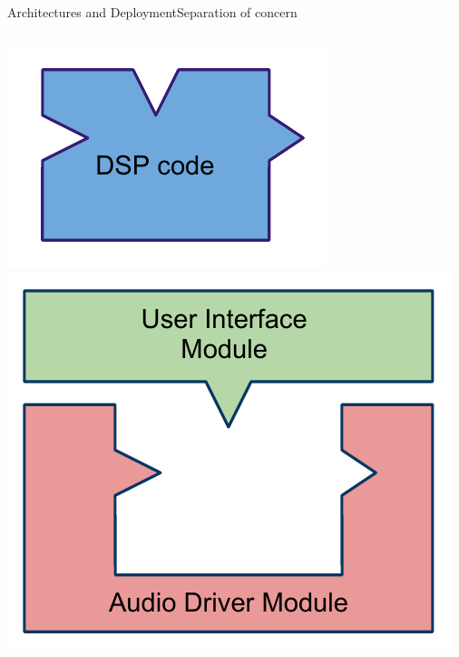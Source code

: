 \begin{frame}{Architectures and Deployment}{Separation of concern}
\begin{columns}[t]
\begin{column}{0.75\textwidth}
	\begin{center}
	\includegraphics[height=0.2\textheight]{images/FaustArchitectureDSPCode}
	\hspace{1cm}
	\includegraphics[height=0.2\textheight]{images/FaustArchitectureModules}
	\end{center}


\end{column}
\end{columns}
\end{frame}
